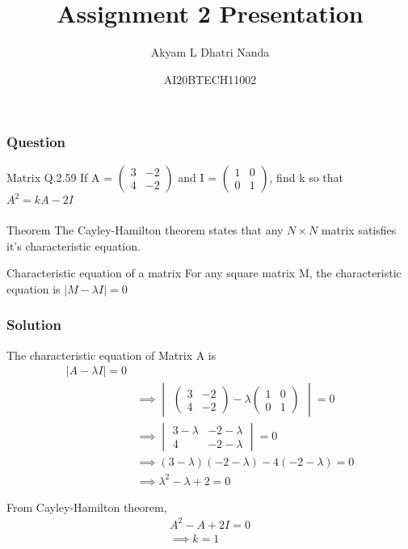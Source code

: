 \documentclass{beamer}
\title{Assignment 2 Presentation}
\author{Akyam L Dhatri Nanda}
\date{AI20BTECH11002}
\newcommand{\myvec}[1]{\ensuremath{\begin{pmatrix}#1\end{pmatrix}}}
\newcommand{\mydet}[1]{\ensuremath{\begin{vmatrix}#1\end{vmatrix}}}
\providecommand{\brak}[1]{\ensuremath{\left(#1\right)}}
\begin{document}
\begin{frame}
\titlepage
\end{frame}

\begin{frame}
\frametitle{Question}
\begin{block}{Matrix Q.2.59}
If A = $\myvec{3 & -2 \\ 4 & -2}$ and I = $\myvec{1 & 0 \\ 0 & 1}$, find k so that $A^2 = kA -2I$
\end{block}
\end{frame}

\begin{frame}
\frametitle{}
\begin{block}{Theorem}
The Cayley-Hamilton theorem states that any $N\times N$ matrix satisfies it's characteristic equation.
\end{block}

\begin{block}{Characteristic equation of a matrix}
For any square matrix M, the characteristic equation is $|{M - \lambda I}| = 0$
\end{block}
\end{frame}
\begin{frame}
\frametitle{Solution}
The characteristic equation of Matrix A is 
\begin{align}
    |{A - \lambda I}| = 0\label{eq 2.0.1}\\
    & \implies \mydet{\myvec{3 & -2 \\ 4 & -2} - \lambda\myvec{1 & 0 \\ 0 & 1}} = 0\\
    & \implies \mydet{3 - \lambda & -2 - \lambda \\ 4 & -2-\lambda} = 0\\
    & \implies \brak{3-\lambda}\brak{-2-\lambda} - 4\brak{-2-\lambda} = 0\\
    & \implies \lambda^2 -\lambda +2 = 0 \label{eq 2.0.5}
\end{align}

From Cayley-Hamilton theorem, 
\begin{align}
    A^2 - A +2I = 0\\
    \implies k=1
\end{align}

\end{frame}
\end{document}
